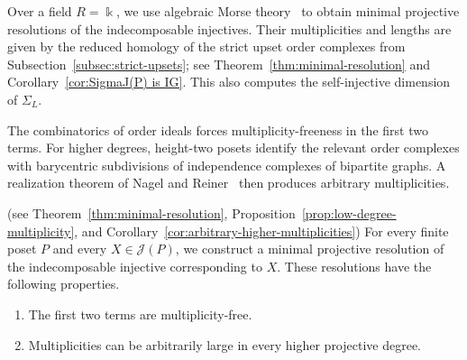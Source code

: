\documentclass[a4paper,leqno]{amsart}
\begin{document}
{\begin{main}\label{main:minimal-resolution-and-ig}
\end{main}

Over a field $R=\Bbbk$, we use algebraic Morse theory~\cite{CLZ26} to obtain minimal projective resolutions of the indecomposable injectives. Their multiplicities and lengths are given by the reduced homology of the strict upset order complexes from Subsection~\ref{subsec:strict-upsets}; see Theorem~\ref{thm:minimal-resolution} and Corollary~\ref{cor:SigmaJ(P) is IG}. This also computes the self-injective dimension of $\Sigma_L$.

The combinatorics of order ideals forces multiplicity-freeness in the first two terms. For higher degrees, height-two posets identify the relevant order complexes with barycentric subdivisions of independence complexes of bipartite graphs. A realization theorem of Nagel and Reiner~\cite{NR09} then produces arbitrary multiplicities.

\begin{main}\label{main:minimal-resolution-and-multiplicities}\textnormal{(see Theorem~\ref{thm:minimal-resolution}, Proposition~\ref{prop:low-degree-multiplicity}, and Corollary~\ref{cor:arbitrary-higher-multiplicities})}
For every finite poset $P$ and every $X\in\mathcal J(P)$, we construct a minimal projective resolution of the indecomposable injective corresponding to $X$. These resolutions have the following properties.
\begin{enumerate}
\item The first two terms are multiplicity-free.
\item Multiplicities can be arbitrarily large in every higher projective degree.
\end{enumerate}
\end{main}

}
\end{document}
